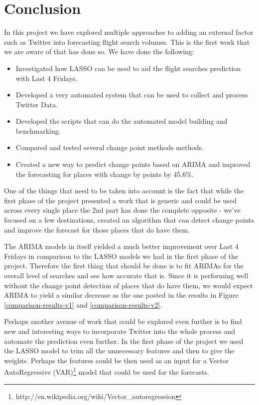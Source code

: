 \documentclass[minf,twoside,singlespacing,parskip,frontabs,notimes,12pt]{infthesis} %
\begin{document}
\section{Conclusion}

In this project we have explored multiple approaches to adding an external factor such as Twitter into forecasting flight search volumes. This is the first work that we are aware of that has done so. We have done the following:

\begin{itemize}
\item Investigated how LASSO can be used to aid the flight searches prediction with Last 4 Fridays.
\item Developed a very automated system that can be used to collect and process Twitter Data.
\item Developed the scripts that can do the automated model building and benchmarking. 
\item Compared and tested several change point methods methods.
\item Created a new way to predict change points based on ARIMA and improved the forecasting for places with change by points by 45.6\%.
\end{itemize}

One of the things that need to be taken into account is the fact that while the first phase of the project presented a work that is generic and could be used across every single place the 2nd part has done the complete opposite - we've focused on a few destinations, created an algorithm that can detect change points and improve the forecast for those places that do have them.

The ARIMA models in itself yielded a much better improvement over Last 4 Fridays in comparison to the LASSO models we had in the first phase of the project. Therefore the first thing that should be done is to fit ARIMAs for the overall level of searches and see how accurate that is. Since it is performing well without the change point detection of places that do have them, we would expect ARIMA to yield a similar decrease as the one posted in the results in Figure \ref{comparison-results-v1} and \ref{comparison-results-v2}. 


Perhaps another avenue of work that could be explored even further is to find new and interesting ways to incorporate Twitter into the whole process and automate the prediction even further. In the first phase of the project we used the LASSO model to trim all the unnecessary features and then to give the weights. Perhaps the features could be then used as an input for a Vector AutoRegressive (VAR)\footnote{http://en.wikipedia.org/wiki/Vector\_autoregression} model that could be used for the forecasts. 



\raggedright
\sloppy


\end{document}
